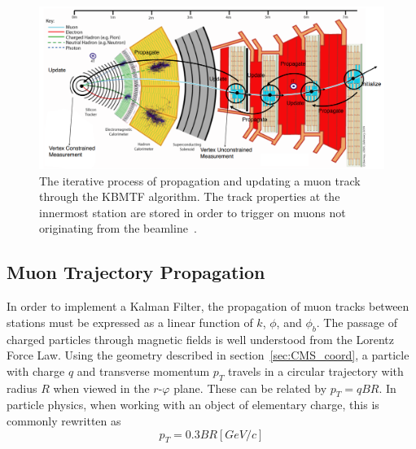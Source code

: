 \begin{figure} [htb!]
	\centering
	\includegraphics[width=0.85\linewidth]{figs/04_muons/kbmtf_diagram.png}
	\caption[The iterative process of propagation and updating a muon track through the KBMTF algorithm. The track properties at the innermost station are stored in order to trigger on muons not originating from the beamline~\cite{CERN-LHCC-2020-004}]
	{The iterative process of propagation and updating a muon track through the KBMTF algorithm. The track properties at the innermost station are stored in order to trigger on muons not originating from the beamline~\cite{CERN-LHCC-2020-004}.}
	\label{fig:kbmtf}
\end{figure}

\subsection{Muon Trajectory Propagation} \label{sec:muons_prop}
In order to implement a Kalman Filter, the propagation of muon tracks between stations must be expressed as a linear function of $k$, $\phi$, and $\phi_b$. The passage of charged particles through magnetic fields is well understood from the Lorentz Force Law. Using the geometry described in section~\ref{sec:CMS_coord}, a particle with charge $q$ and transverse momentum $p_T$ travels in a circular trajectory with radius $R$ when viewed in the $r$-$\varphi$ plane. These can be related by $p_{T} = qBR$. In particle physics, when working with an object of elementary charge, this is commonly rewritten as
\begin{equation}
	\label{eq:pt03br}
	p_{T} = 0.3BR\unit{[GeV/c]}
\end{equation} 

